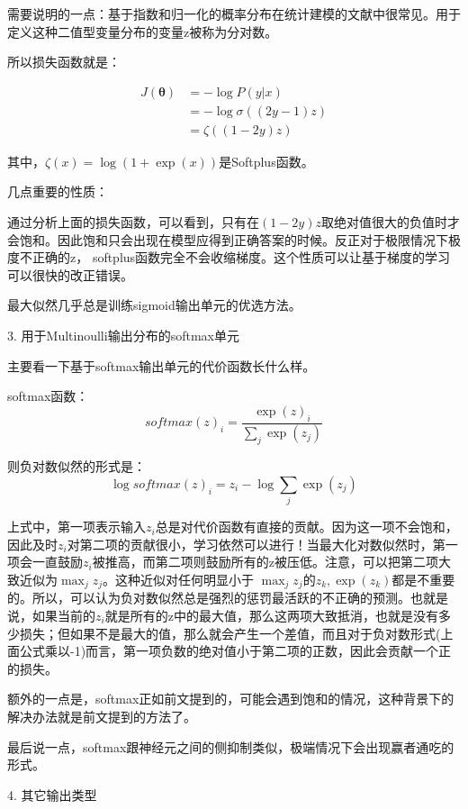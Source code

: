 需要说明的一点：基于指数和归一化的概率分布在统计建模的文献中很常见。用于定义这种二值型变量分布的变量z被称为分对数。

所以损失函数就是：

\begin{align*}
J(\mathbf{\theta}) &= -\log P(y|x) \\
	& = -\log \sigma((2y - 1)z) \\
	& = \zeta ((1-2y)z)
\end{align*}

其中，$\zeta(x) = \log (1 + \exp(x))$是Softplus函数。

几点重要的性质：

通过分析上面的损失函数，可以看到，只有在$(1-2y)z$取绝对值很大的负值时才会饱和。因此饱和只会出现在模型应得到正确答案的时候。反正对于极限情况下极度不正确的z， softplus函数完全不会收缩梯度。这个性质可以让基于梯度的学习可以很快的改正错误。

最大似然几乎总是训练sigmoid输出单元的优选方法。

3. 用于Multinoulli输出分布的softmax单元

主要看一下基于softmax输出单元的代价函数长什么样。

softmax函数：
\begin{displaymath}
softmax(z)_i = \frac{\exp(z)_i}{\sum_{j}\exp(z_j)}
\end{displaymath}

则负对数似然的形式是：
\begin{displaymath}
\log softmax(z)_i = z_i - \log \sum_{j} \exp(z_j)
\end{displaymath}

上式中，第一项表示输入$z_i$总是对代价函数有直接的贡献。因为这一项不会饱和，因此及时$z_i$对第二项的贡献很小，学习依然可以进行！当最大化对数似然时，第一项会一直鼓励$z_i$被推高，而第二项则鼓励所有的z被压低。注意，可以把第二项大致近似为$\max_j z_j$。这种近似对任何明显小于 $\max_j z_j$的$z_k, \exp(z_k)$都是不重要的。所以，可以认为负对数似然总是强烈的惩罚最活跃的不正确的预测。也就是说，如果当前的$z_i$就是所有的z中的最大值，那么这两项大致抵消，也就是没有多少损失；但如果不是最大的值，那么就会产生一个差值，而且对于负对数形式(上面公式乘以-1)而言，第一项负数的绝对值小于第二项的正数，因此会贡献一个正的损失。

额外的一点是，softmax正如前文提到的，可能会遇到饱和的情况，这种背景下的解决办法就是前文提到的方法了。

最后说一点，softmax跟神经元之间的侧抑制类似，极端情况下会出现赢者通吃的形式。

4. 其它输出类型

